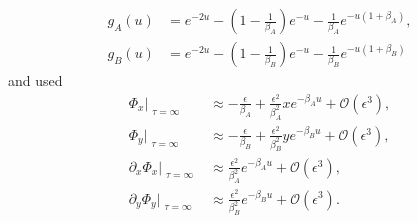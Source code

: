 \documentclass[11pt]{article}
\begin{document}
\begin{subequations}\begin{align}
    g_A(u) & = e^{-2u} - \left(1-\frac{1}{\beta_A}\right)e^{-u}-\frac{1}{\beta_A}e^{-u(1+\beta_A)}, \\
    g_B(u) & = e^{-2u} - \left(1-\frac{1}{\beta_B}\right)e^{-u}-\frac{1}{\beta_B}e^{-u(1+\beta_B)}
\end{align}\end{subequations}
and used
\begin{subequations}\begin{align}
    \Phi_x \Big\vert_{\substack{\tau=\infty}} &\approx - \frac{\epsilon}{\beta_A} + \frac{\epsilon^2}{\beta_A^2}xe^{-\beta_Au} +\mathcal{O}(\epsilon^3), \\
    \Phi_y \Big\vert_{\substack{\tau=\infty}} &\approx - \frac{\epsilon}{\beta_B} + \frac{\epsilon^2}{\beta_B^2}ye^{-\beta_Bu} +\mathcal{O}(\epsilon^3), \\
    \partial_x \Phi_x \Big\vert_{\substack{\tau=\infty}} &\approx \frac{\epsilon^2}{\beta_A^2}e^{-\beta_Au} +\mathcal{O}(\epsilon^3), \\
    \partial_y \Phi_y \Big\vert_{\substack{\tau=\infty}} &\approx \frac{\epsilon^2}{\beta_B^2}e^{-\beta_Bu} +\mathcal{O}(\epsilon^3).
\end{align}\end{subequations}
\end{document}
